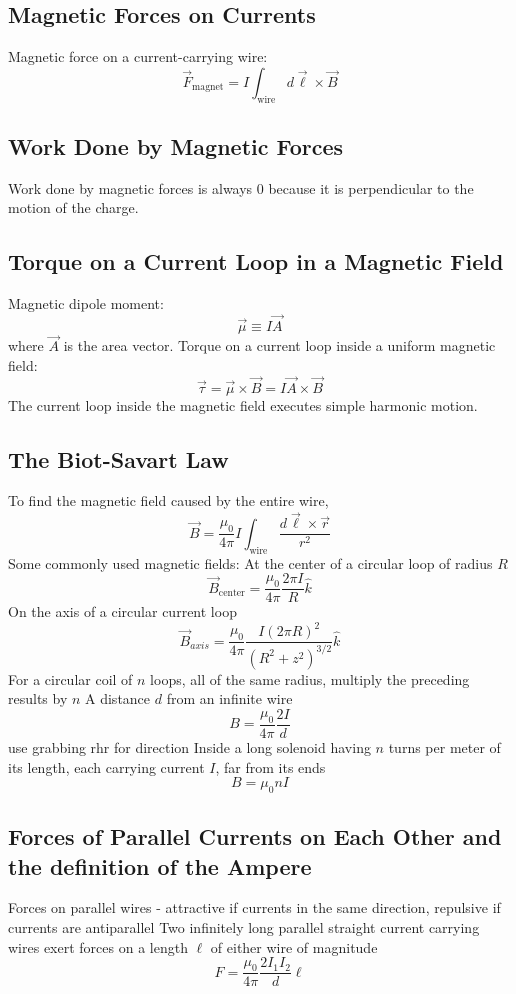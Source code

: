 \documentclass[twocolumn]{article}
\begin{document}
\subsection{Magnetic Forces on Currents}
\begin{outline}
	\1 Magnetic force on a current-carrying wire: \[\vec{F}_{\text{magnet}}=I\int_{\text{wire}}d\vec{\ell}\times\vec{B}\]

\end{outline}
\subsection{Work Done by Magnetic Forces}
\begin{outline}
	\1 Work done by magnetic forces is always 0 because it is perpendicular to the motion of the charge. 
\end{outline}
\subsection{Torque on a Current Loop in a Magnetic Field}
\begin{outline}
	\1 Magnetic dipole moment: \[\vec{\mu}\equiv I\vec{A}\] where $\vec{A}$ is the area vector. 
	\1 Torque on a current loop inside a uniform magnetic field: \[\vec{\tau}=\vec{\mu}\times\vec{B}=I\vec{A}\times\vec{B}\]
	\1 The current loop inside the magnetic field executes simple harmonic motion. 
\end{outline}
\subsection{The Biot-Savart Law}
\begin{outline}
	\1 To find the magnetic field caused by the entire wire, \[\vec{B}=\dfrac{\mu_0}{4\pi}I\int_{\text{wire}}\dfrac{d\vec{\ell}\times\vec{r}}{r^2}\]
	\1 Some commonly used magnetic fields: 
		\2 At the center of a circular loop of radius $R$ \[\vec{B}_{\text{center}}=\dfrac{\mu_0}{4\pi}\dfrac{2\pi I}{R}\hat{k}\]
		\2 On the axis of a circular current loop \[\vec{B}_{axis}=\dfrac{\mu_0}{4\pi}\dfrac{I(2\pi R)^2}{(R^2+z^2)^{3/2}}\hat{k}\]
		\2 For a circular coil of $n$ loops, all of the same radius, multiply the preceding results by $n$
		\2 A distance $d$ from an infinite wire \[B=\dfrac{\mu_0}{4\pi}\dfrac{2I}{d}\] use grabbing rhr for direction 
		\2 Inside a long solenoid having $n$ turns per meter of its length, each carrying current $I$, far from its ends \[B=\mu_0nI\]
\end{outline}
\subsection{Forces of Parallel Currents on Each Other and the definition of the Ampere}
\begin{outline}
	\1 Forces on parallel wires - attractive if currents in the same direction, repulsive if currents are antiparallel
	\1 Two infinitely long parallel straight current carrying wires exert forces on a length $\ell$ of either wire of magnitude \[F=\dfrac{\mu_0}{4\pi}\dfrac{2I_1I_2}{d}\ell\]

\end{outline}
\end{document}
